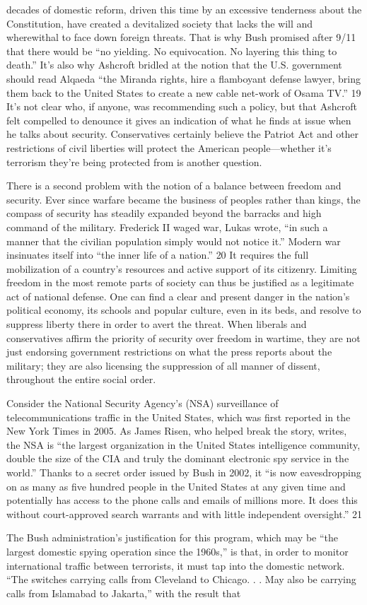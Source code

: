 decades of domestic reform, driven this time by an excessive tenderness about the Constitution, have created a devitalized society that lacks the will and wherewithal to face down foreign threats. That is why Bush promised after 9/11 that there would be “no yielding. No equivocation. No layering this thing to death.” It’s also why Ashcroft bridled at the notion that the U.S. government should read Alqaeda “the Miranda rights, hire a flamboyant defense lawyer, bring them back to the United States to create a new cable net-work of Osama TV.” {\color{blue} 19 } It’s not clear who, if anyone, was recommending such a policy, but that Ashcroft felt compelled to denounce it gives an indication of what he finds at issue when he talks about security. Conservatives certainly believe the Patriot Act and other restrictions of civil liberties will protect the American people—whether it’s terrorism they’re being protected from is another question.{\par} There is a second problem with the notion of a balance between freedom and security. Ever since warfare became the business of peoples rather than kings, the compass of security has steadily expanded beyond the barracks and high command of the military. Frederick II waged war, Lukas wrote, “in such a manner that the civilian population simply would not notice it.” Modern war insinuates itself into “the inner life of a nation.” {\color{blue} 20 } It requires the full mobilization of a country’s resources and active support of its citizenry. Limiting freedom in the most remote parts of society can thus be justified as a legitimate act of national defense. One can find a clear and present danger in the nation’s political economy, its schools and popular culture, even in its beds, and resolve to suppress liberty there in order to avert the threat. When liberals and conservatives affirm the priority of security over freedom in wartime, they are not just endorsing government restrictions on what the press reports about the military; they are also licensing the suppression of all manner of dissent, throughout the entire social order.{\par} Consider the National Security Agency’s (NSA) surveillance of telecommunications traffic in the United States, which was first reported in the New York Times in 2005. As James Risen, who helped break the story, writes, the NSA is “the largest organization in the United States intelligence community, double the size of the CIA and truly the dominant electronic spy service in the world.” Thanks to a secret order issued by Bush in 2002, it “is now eavesdropping on as many as five hundred people in the United States at any given time and potentially has access to the phone calls and emails of millions more. It does this without court-approved search warrants and with little independent oversight.” {\color{blue} 21 } {\par} The Bush administration’s justification for this program, which may be “the largest domestic spying operation since the 1960s,” is that, in order to monitor international traffic between terrorists, it must tap into the domestic network. “The switches carrying calls from Cleveland to Chicago. . . May also be carrying calls from Islamabad to Jakarta,” with the result that 